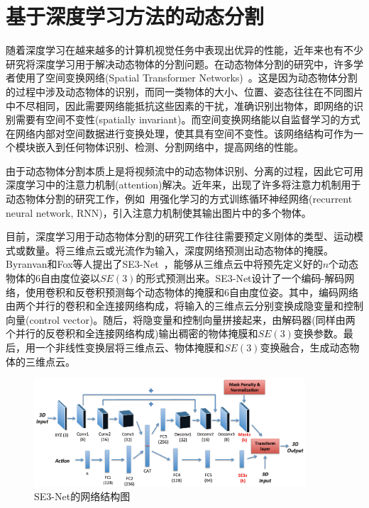 \section{基于深度学习方法的动态分割}
\label{sec:learning}
随着深度学习在越来越多的计算机视觉任务中表现出优异的性能，近年来也有不少研究将深度学习用于解决动态物体的分割问题。在动态物体分割的研究中，许多学者使用了空间变换网络(Spatial Transformer Networks)~\cite{2015spatial}。这是因为动态物体分割的过程中涉及动态物体的识别，而同一类物体的大小、位置、姿态往往在不同图片中不尽相同，因此需要网络能抵抗这些因素的干扰，准确识别出物体，即网络的识别需要有空间不变性(spatially invariant)。而空间变换网络能以自监督学习的方式在网络内部对空间数据进行变换处理，使其具有空间不变性。该网络结构可作为一个模块嵌入到任何物体识别、检测、分割网络中，提高网络的性能。

由于动态物体分割本质上是将视频流中的动态物体识别、分离的过程，因此它可用深度学习中的注意力机制(attention)解决。近年来，出现了许多将注意力机制用于动态物体分割的研究工作，例如~\cite{2014multiple}用强化学习的方式训练循环神经网络(recurrent neural network, RNN)，引入注意力机制使其输出图片中的多个物体。

目前，深度学习用于动态物体分割的研究工作往往需要预定义刚体的类型、运动模式或数量。将三维点云或光流作为输入，深度网络预测出动态物体的掩膜。Byranvan和Fox等人提出了SE3-Net~\cite{se3}，能够从三维点云中将预先定义好的$n$个动态物体的6自由度位姿以$SE(3)$的形式预测出来。SE3-Net设计了一个编码-解码网络，使用卷积和反卷积预测每个动态物体的掩膜和6自由度位姿。其中，编码网络由两个并行的卷积和全连接网络构成，将输入的三维点云分别变换成隐变量和控制向量(control vector)。随后，将隐变量和控制向量拼接起来，由解码器(同样由两个并行的反卷积和全连接网络构成)输出稠密的物体掩膜和$SE(3)$变换参数。最后，用一个非线性变换层将三维点云、物体掩膜和$SE(3)$变换融合，生成动态物体的三维点云。

\begin{figure}[htbp]
	\centering
	\includegraphics[width=0.9\textwidth]{figs/1-2/se3-net.png} 
	\caption{SE3-Net的网络结构图}
	\label{se3-net}
\end{figure}

